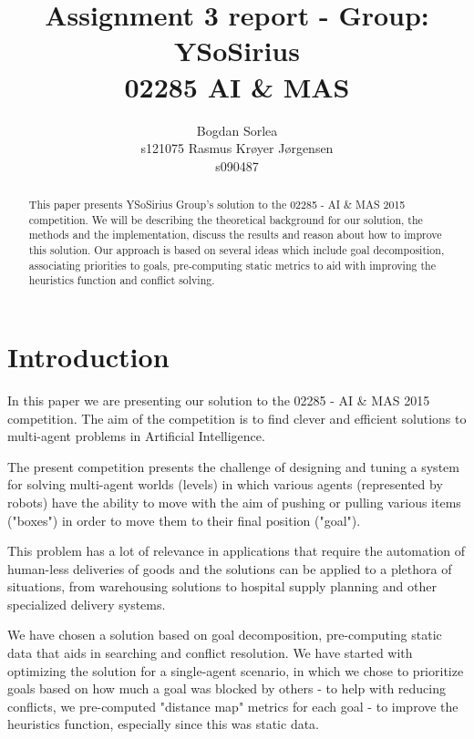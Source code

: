 \documentclass[letterpaper]{article}
\begin{document}
\title{Assignment 3 report - Group: YSoSirius \\ 02285 AI \& MAS}
\author{Bogdan Sorlea \\ s121075 \And Rasmus Kr{\o}yer J{\o}rgensen \\ s090487}
\maketitle
\begin{abstract}
This paper presents YSoSirius Group's solution to the 02285 - AI \& MAS 2015 competition. We will be describing the theoretical background for our solution, the methods and the implementation, discuss the results and reason about how to improve this solution. Our approach is based on several ideas which include goal decomposition, associating priorities to goals, pre-computing static metrics to aid with improving the heuristics function and conflict solving.
\end{abstract}

\section{Introduction}
In this paper we are presenting our solution to the 02285 - AI \& MAS 2015 competition. The aim of the competition is to find clever and efficient solutions to multi-agent problems in Artificial Intelligence.

The present competition presents the challenge of designing and tuning a system for solving multi-agent worlds (levels) in which various agents (represented by robots) have the ability to move with the aim of pushing or pulling various items ("boxes") in order to move them to their final position ("goal").

This problem has a lot of relevance in applications that require the automation of human-less deliveries of goods and the solutions can be applied to a plethora of situations, from warehousing solutions to hospital supply planning and other specialized delivery systems.

We have chosen a solution based on goal decomposition, pre-computing static data that aids in searching and conflict resolution. We have started with optimizing the solution for a single-agent scenario, in which we chose to prioritize goals based on how much a goal was blocked by others - to help with reducing conflicts, we pre-computed "distance map" metrics for each goal - to improve the heuristics function, especially since this was static data. 
\end{document}
